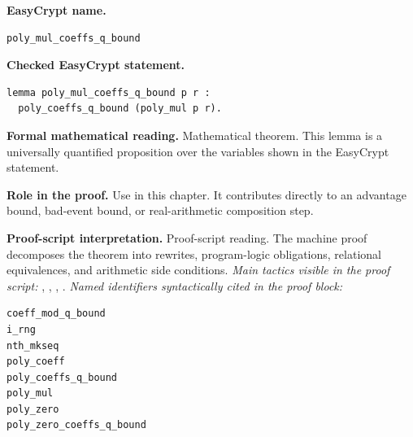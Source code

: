 \begin{formaltheorem}
\noindent\textbf{EasyCrypt name.}
\begin{lstlisting}[language=EasyCrypt,basicstyle=\ttfamily\scriptsize]
poly_mul_coeffs_q_bound
\end{lstlisting}
\noindent\textbf{Checked EasyCrypt statement.}
\begin{lstlisting}[language=EasyCrypt,basicstyle=\ttfamily\scriptsize]
lemma poly_mul_coeffs_q_bound p r :
  poly_coeffs_q_bound (poly_mul p r).
\end{lstlisting}
\noindent\textbf{Formal mathematical reading.}
Mathematical theorem. This lemma is a universally quantified proposition over the variables shown in the EasyCrypt statement.

\noindent\textbf{Role in the proof.}
Use in this chapter. It contributes directly to an advantage bound, bad-event bound, or real-arithmetic composition step.

\noindent\textbf{Proof-script interpretation.}
Proof-script reading. The machine proof decomposes the theorem into rewrites, program-logic obligations, relational equivalences, and arithmetic side conditions.
\emph{Main tactics visible in the proof script:} , , , .
\emph{Named identifiers syntactically cited in the proof block:}
\begin{lstlisting}[language=EasyCrypt,basicstyle=\ttfamily\scriptsize]
coeff_mod_q_bound
i_rng
nth_mkseq
poly_coeff
poly_coeffs_q_bound
poly_mul
poly_zero
poly_zero_coeffs_q_bound
\end{lstlisting}

\end{formaltheorem}

